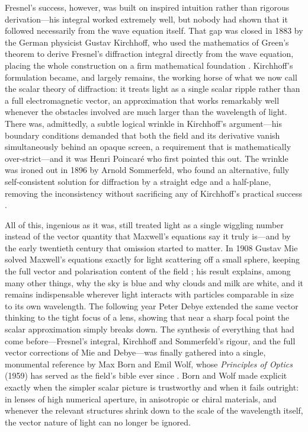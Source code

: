	Fresnel's success, however, was built on inspired intuition rather than rigorous derivation---his integral worked extremely well, but nobody had shown that it followed necessarily from the wave equation itself. That gap was closed in 1883 by the German physicist Gustav Kirchhoff, who used the mathematics of Green's theorem to derive Fresnel's diffraction integral directly from the wave equation, placing the whole construction on a firm mathematical foundation \cite{kirchhoff1883theorie}. Kirchhoff's formulation became, and largely remains, the working horse of what we now call the scalar theory of diffraction: it treats light as a single scalar ripple rather than a full electromagnetic vector, an approximation that works remarkably well whenever the obstacles involved are much larger than the wavelength of light. There was, admittedly, a subtle logical wrinkle in Kirchhoff's argument---his boundary conditions demanded that both the field and its derivative vanish simultaneously behind an opaque screen, a requirement that is mathematically over-strict---and it was Henri Poincaré who first pointed this out. The wrinkle was ironed out in 1896 by Arnold Sommerfeld, who found an alternative, fully self-consistent solution for diffraction by a straight edge and a half-plane, removing the inconsistency without sacrificing any of Kirchhoff's practical success \cite{sommerfeld1896mathematische, sommerfeld1954optics}.

	All of this, ingenious as it was, still treated light as a single wiggling number instead of the vector quantity that Maxwell's equations say it truly is---and by the early twentieth century that omission started to matter. In 1908 Gustav Mie solved Maxwell's equations exactly for light scattering off a small sphere, keeping the full vector and polarisation content of the field \cite{mie1908beitrage}; his result explains, among many other things, why the sky is blue and why clouds and milk are white, and it remains indispensable wherever light interacts with particles comparable in size to its own wavelength. The following year Peter Debye extended the same vector thinking to the tight focus of a lens, showing that near a sharp focal point the scalar approximation simply breaks down. The synthesis of everything that had come before---Fresnel's integral, Kirchhoff and Sommerfeld's rigour, and the full vector corrections of Mie and Debye---was finally gathered into a single, monumental reference by Max Born and Emil Wolf, whose \textit{Principles of Optics} (1959) has served as the field's bible ever since \cite{born1999principles}. Born and Wolf made explicit exactly when the simpler scalar picture is trustworthy and when it fails outright: in lenses of high numerical aperture, in anisotropic or chiral materials, and whenever the relevant structures shrink down to the scale of the wavelength itself, the vector nature of light can no longer be ignored.

